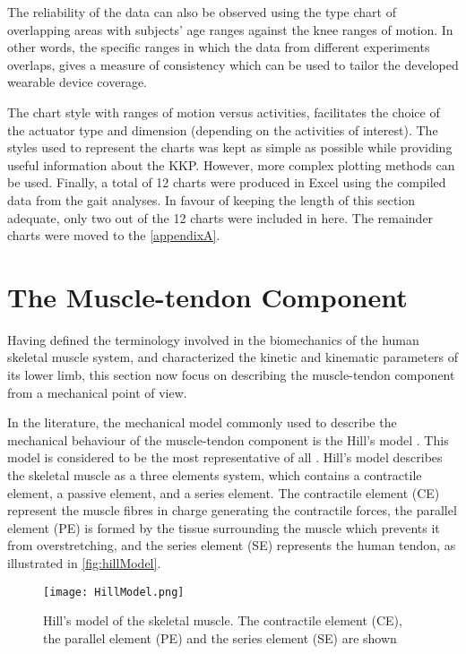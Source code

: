 The reliability of the data can also be observed using the type chart of overlapping areas with subjects' age ranges against the knee ranges of motion. In other words, the specific ranges in which the data from different experiments overlaps, gives a measure of consistency which can be used to tailor the developed wearable device coverage. 

The chart style with ranges of motion versus activities, facilitates the choice of the actuator type and dimension (depending on the activities of interest). The styles used to represent the charts was kept as simple as possible while providing useful information about the KKP. However, more complex plotting methods can be used. Finally, a total of 12 charts were produced in Excel\textregistered{} using the compiled data from the gait analyses. In favour of keeping the length of this section adequate, only two out of the 12 charts were included in here. The remainder charts were moved to the \autoref{appendixA}.

\section{The Muscle-tendon Component} \label{sec:muscle_tendon}

Having defined the terminology involved in the biomechanics of the human skeletal muscle system, and characterized the kinetic and kinematic parameters of its lower limb, this section now focus on describing the muscle-tendon component from a mechanical point of view. 

In the literature, the mechanical model commonly used to describe the mechanical behaviour of the muscle-tendon component is the Hill's model \cite{hill1938heat}. This model is considered to be the most representative of all \cite{zhang2012sma}. Hill’s model describes the skeletal muscle as a three elements system, which contains a contractile element, a passive element, and a series element. The contractile element (CE) represent the muscle fibres in charge generating the contractile forces, the parallel element (PE) is formed by the tissue surrounding the muscle which prevents it from overstretching, and the series element (SE) represents the human tendon, as illustrated in \autoref{fig:hillModel}.

\begin{figure}[htb!]
    \centering
    \texttt{[image: HillModel.png]}
    \caption{Hill's model of the skeletal muscle. The contractile element (CE), the parallel element (PE) and the series element (SE) are shown \cite{hill1938heat} }
    \label{fig:hillModel}
\end{figure}

